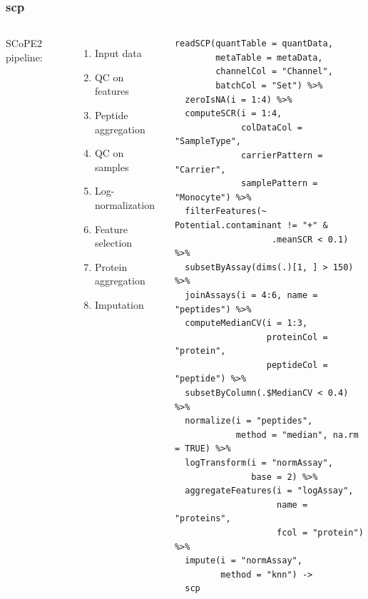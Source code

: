 \documentclass{beamer}
\newcommand{\hcode}[2][lgray]{{\ttfamily\color{vdgray}\colorbox{#1}{#2}}}
\begin{document}
\begin{frame}[fragile]
  \frametitle{\hcode{scp}}
 
  \begin{columns}
    \footnotesize
    SCoPE2 pipeline:\\
    \begin{enumerate}
      \item Input data
      \item QC on features
      \item Peptide aggregation
      \item QC on samples
      \item Log-normalization
      \item Feature selection
      \item Protein aggregation 
      \item Imputation
    \end{enumerate}
    
    
    \begin{lstlisting}
readSCP(quantTable = quantData, 
        metaTable = metaData,
        channelCol = "Channel", 
        batchCol = "Set") %>%
  zeroIsNA(i = 1:4) %>%
  computeSCR(i = 1:4, 
             colDataCol = "SampleType",
             carrierPattern = "Carrier",
             samplePattern = "Monocyte") %>%
  filterFeatures(~ Potential.contaminant != "+" & 
                   .meanSCR < 0.1) %>%
  subsetByAssay(dims(.)[1, ] > 150) %>%
  joinAssays(i = 4:6, name = "peptides") %>%
  computeMedianCV(i = 1:3, 
                  proteinCol = "protein",
                  peptideCol = "peptide") %>%
  subsetByColumn(.$MedianCV < 0.4) %>%
  normalize(i = "peptides", 
            method = "median", na.rm = TRUE) %>%
  logTransform(i = "normAssay",
               base = 2) %>%
  aggregateFeatures(i = "logAssay", 
                    name = "proteins",
                    fcol = "protein") %>%
  impute(i = "normAssay",
         method = "knn") ->
  scp
    \end{lstlisting}
  \end{columns}
\end{frame}
\end{document}
